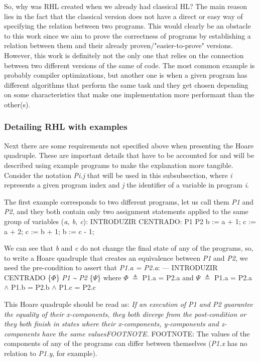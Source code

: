 {So, why was RHL created when we already had classical HL? 
The main reason lies in the fact that the classical version does not have a direct or easy way of specifying the relation between two programs. 
This would clearly be an obstacle to this work since we aim to prove the correctness of programs by establishing a relation between them and their already proven/"easier-to-prove" versions.
However, this work is definitely not the only one that relies on the connection between two different versions of the same of code.
The most common example is probably compiler optimizations, but another one is when a given program has different algorithms that perform the same task and they get chosen depending on some characteristics that make one implementation more performant than the other(s).


\subsubsection{Detailing RHL with examples}
\label{sub:relational_hoare_logic_examples}

Next there are some requirements not specified above when presenting the Hoare quadruple.
These are important details that have to be accounted for and will be described using example programs to make the explanation more tangible.
Consider the notation \emph{Pi.j} that will be used in this subsubsection, where \emph{i} represents a given program index and \emph{j} the identifier of a variable in program \emph{i}.

The first example corresponds to two different programs, let us call them \emph{P1} and \emph{P2}, and they both contain only two assignment statements applied to the same group of variables (\emph{a, b, c}): 
INTRODUZIR CENTRADO:
P1 P2
b := a + 1; c := a + 2;
c := b + 1; b := c - 1;

We can see that \emph{b} and \emph{c} do not change the final state of any of the programs, so, to write a Hoare quadruple that creates an equivalence between \emph{P1} and \emph{P2}, we need the pre-condition to assert that \emph{P1.a = P2.a}:
--- INTRODUZIR CENTRADO \{$\Phi$\} \emph{P1} \emph{\textasciitilde} \emph{P2} \{$\Psi$\} where $\Phi$ $\triangleq$ P1.a = P2.a
                                                                                           and $\Psi$ $\triangleq$ P1.a = P2.a $\land$ P1.b = P2.b $\land$ P1.c = P2.c

This Hoare quadruple should be read as: \emph{If an execution of P1 and P2 guarantee the equality of their x-components, they both diverge from the post-condition or they both finish in states where their x-components, y-components and z-components have the same valuesFOOTNOTE.}
FOOTNOTE: The values of the components of any of the programs can differ between themselves (\emph{P1.x} has no relation to \emph{P1.y}, for example).

}

